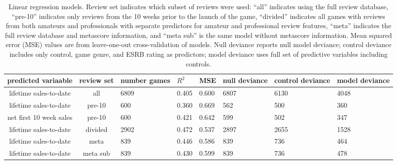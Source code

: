\documentclass[letterpaper]{article}
\begin{document}
\begin{table}[tb]
\centering
\scriptsize
\begin{tabularx}{\linewidth}{|c|c|X|X|X|X|X|X|}
\hline\textbf{ predicted variaable} & \textbf{review set} & \textbf{number games} & $R^2$ & MSE & null deviance & control deviance & model deviance \\ 
\hline lifetime sales-to-date & all & 6809 & 0.405 & 0.600 & 6807 & 6130 & 4048\\ 
\hline lifetime sales-to-date & pre-10 & 600 & 0.360 & 0.669 & 562 & 500 & 360\\ 
\hline net first 10 week sales & pre-10 & 600 & 0.421 & 0.642 & 599 & 502 & 347\\ 
\hline lifetime sales-to-date & divided & 2902 & 0.472 & 0.537 & 2897 & 2655 & 1528\\ 
\hline lifetime sales-to-date & meta & 839 & 0.446 & 0.586 & 839 & 736 & 464\\ 
\hline lifetime sales-to-date & meta sub & 839 & 0.430 & 0.599 & 839 & 736 & 478\\ 
\hline 
\end{tabularx}
\caption{Linear regression models. Review set indicates which subset of reviews were used: ``all'' indicates using the full review database, ``pre-10'' indicates only reviews from the 10 weeks prior to the launch of the game, ``divided'' indicates all games with reviews from both amateurs and professionals with separate predictors for amateur and professional review features, ``meta'' indicates the full review database and metascore information, and ``meta sub'' is the same model without metascore information. Mean squared error (MSE) values are from leave-one-out cross-validation of models. Null deviance reports null model deviance; control deviance includes only control, game genre, and ESRB rating as predictors; model deviance uses full set of predictive variables including controls.}
\label{tab:regression_models}
\end{table}
\end{document}
